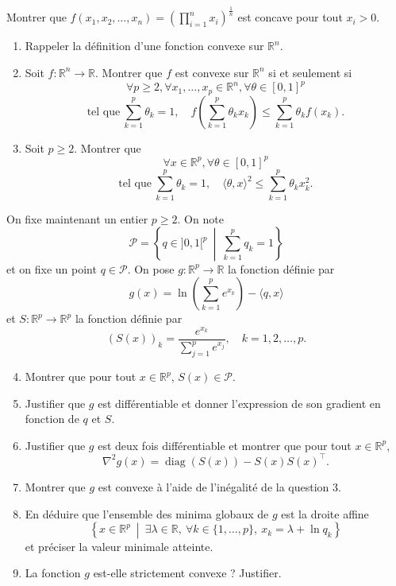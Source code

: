 \begin{exo}
	Montrer que $f(x_{1}, x_{2}, \ldots, x_{n}) = \left( \prod_{i=1}^{n} x_{i} \right)^{\frac{1}{n}}$ est concave pour tout $x_{i} > 0$.
\end{exo}

\begin{exo}
	\begin{enumerate}
		\item Rappeler la définition d'une fonction convexe sur $\mathbb{R}^{n}$.
		\item Soit $f : \mathbb{R}^{n} \rightarrow \mathbb{R}$. Montrer que $f$ est convexe sur $\mathbb{R}^{n}$ si et seulement si
		\[
		\forall p \geqslant 2, \forall x_{1}, \ldots, x_{p} \in \mathbb{R}^{n}, \forall \theta \in [0,1]^{p}
		\]
		\[
		\text{tel que} \ \sum_{k=1}^{p} \theta_{k} = 1, \quad f\left( \sum_{k=1}^{p} \theta_{k} x_{k} \right) \leqslant \sum_{k=1}^{p} \theta_{k} f(x_{k}).
		\]
		\item Soit $p \geqslant 2$. Montrer que
		\[
		\forall x \in \mathbb{R}^{p}, \forall \theta \in [0,1]^{p}
		\]
		\[
		\text{tel que} \ \sum_{k=1}^{p} \theta_{k} = 1, \quad \langle \theta, x \rangle^{2} \leqslant \sum_{k=1}^{p} \theta_{k} x_{k}^{2}.
		\]
	\end{enumerate}

	On fixe maintenant un entier $p \geqslant 2$. On note
	\[
	\mathcal{P} = \left\{ q \in ]0,1[^{p} \ \middle| \ \sum_{k=1}^{p} q_{k} = 1 \right\}
	\]
	et on fixe un point $q \in \mathcal{P}$. On pose $g : \mathbb{R}^{p} \rightarrow \mathbb{R}$ la fonction définie par
	\[
	g(x) = \ln\left( \sum_{k=1}^{p} e^{x_{k}} \right) - \langle q, x \rangle
	\]
	et $S : \mathbb{R}^{p} \rightarrow \mathbb{R}^{p}$ la fonction définie par
	\[
	(S(x))_{k} = \frac{e^{x_{k}}}{\sum_{j=1}^{p} e^{x_{j}}}, \quad k = 1, 2, \ldots, p.
	\]

	\begin{enumerate}
		\setcounter{enumi}{3}
		\item Montrer que pour tout $x \in \mathbb{R}^{p}$, $S(x) \in \mathcal{P}$.
		\item Justifier que $g$ est différentiable et donner l'expression de son gradient en fonction de $q$ et $S$.
		\item Justifier que $g$ est deux fois différentiable et montrer que pour tout $x \in \mathbb{R}^{p}$,
		\[
		\nabla^{2} g(x) = \operatorname{diag}(S(x)) - S(x) S(x)^{\top}.
		\]
		\item Montrer que $g$ est convexe à l'aide de l'inégalité de la question 3.
		\item En déduire que l'ensemble des minima globaux de $g$ est la droite affine
		\[
		\left\{ x \in \mathbb{R}^{p} \ \middle| \ \exists \lambda \in \mathbb{R}, \ \forall k \in \{1, \ldots, p\}, \ x_{k} = \lambda + \ln q_{k} \right\}
		\]
		et préciser la valeur minimale atteinte.
		\item La fonction $g$ est-elle strictement convexe ? Justifier.
	\end{enumerate}
\end{exo}


